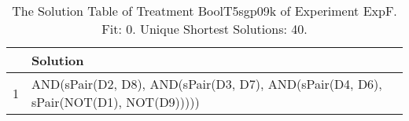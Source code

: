 \begin{table}[ht]
\centering
\begin{tabular}{rp{9cm}}
  \hline
 & Solution \\ 
  \hline
1 & AND(sPair(D2, D8), AND(sPair(D3, D7), AND(sPair(D4, D6), sPair(NOT(D1), NOT(D9))))) \\ 
   \hline
\end{tabular}
\caption{The Solution Table of Treatment BoolT5sgp09k of Experiment ExpF. Fit: 0. Unique Shortest Solutions: 40.} 
\end{table}
